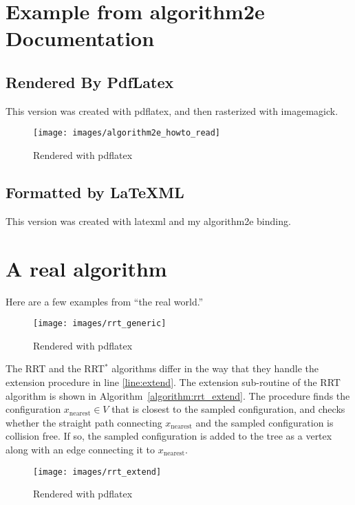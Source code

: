 \documentclass{article}
\begin{document}
\section{Example from algorithm2e Documentation}

\subsection{Rendered By PdfLatex}

This version was created with pdflatex, and then rasterized with imagemagick.
 
\begin{figure}[h]
    \centering
    \texttt{[image: images/algorithm2e\_howto\_read]}
    \caption{Rendered with pdflatex}
\end{figure}

\subsection{Formatted by LaTeXML}

This version was created with latexml and my algorithm2e binding.




\section{A real algorithm}

Here are a few examples from ``the real world.''

\begin{figure}[h]
    \centering
    \texttt{[image: images/rrt\_generic]}
    \caption{Rendered with pdflatex}
\end{figure}





The RRT and the RRT$^*$ algorithms differ in the way that they handle the extension procedure in line \ref{line:extend}.
%
The extension sub-routine of the RRT algorithm is shown in Algorithm~\ref{algorithm:rrt_extend}. 
%
The procedure finds the configuration $x_\mathrm{nearest} \in V$ that is closest to the sampled configuration, and checks whether the straight path connecting $x_\mathrm{nearest}$ and the sampled configuration is collision free. If so, the sampled configuration is added to the tree as a vertex along with an edge connecting it to $x_\mathrm{nearest}$.

\begin{figure}[h]
    \centering
    \texttt{[image: images/rrt\_extend]}
    \caption{Rendered with pdflatex}
\end{figure}
\end{document}
